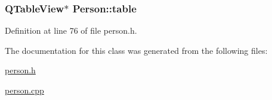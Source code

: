 \hypertarget{class_person_aefba04c96d0d90ab2b220e6ad704c55a}{
\subsubsection[{table}]{\setlength{\rightskip}{0pt plus 5cm}Q\+Table\+View$\ast$ Person\+::table\hspace{0.3cm}{\ttfamily [private]}}}\label{class_person_aefba04c96d0d90ab2b220e6ad704c55a}


Definition at line 76 of file person.\+h.



The documentation for this class was generated from the following files\+:\begin{DoxyCompactItemize}
\item 
\hyperlink{person_8h}{person.\+h}\item 
\hyperlink{person_8cpp}{person.\+cpp}\end{DoxyCompactItemize}
